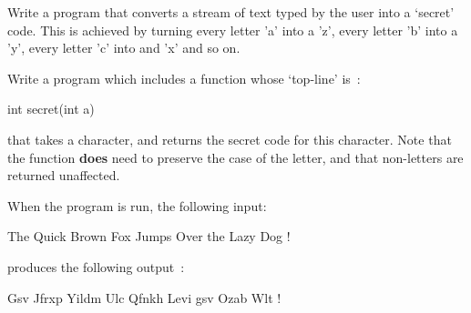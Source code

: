 
Write a program that converts a stream of text typed by the user
into a `secret' code.
This is achieved by turning every letter 'a' into a 'z', every letter 'b'
into a 'y', every letter 'c' into and 'x' and so on.

\begin{exercise}
Write a program which includes a function whose `top-line' is~:

\begin{codesnippet}
int secret(int a)
\end{codesnippet}

that takes a character, and returns the secret code for this character.
Note that the function {\bf does} need to preserve the case of the letter,
and that non-letters are returned unaffected. 

When the program is run, the following input:
\begin{terminaloutput}
The Quick Brown Fox Jumps Over the Lazy Dog !
\end{terminaloutput}
produces the following output~:
\begin{terminaloutput}
Gsv Jfrxp Yildm Ulc Qfnkh Levi gsv Ozab Wlt !
\end{terminaloutput}
\end{exercise}
